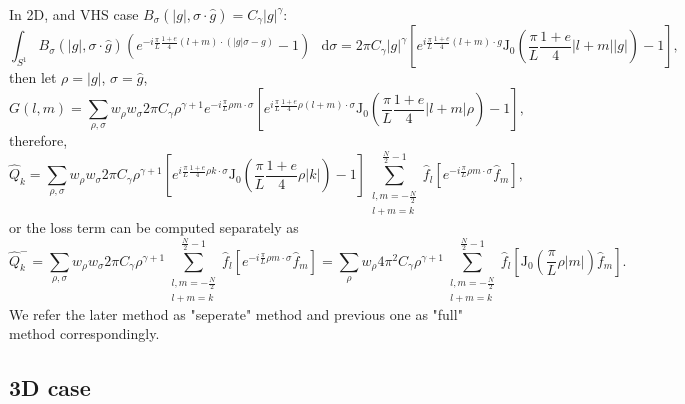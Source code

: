 \documentclass[review, times]{elsarticle}
\newcommand*\diff{\mathop{}\!\mathrm{d}}
\begin{document}
In 2D, and VHS case $B_{\sigma}(|g|,\sigma\cdot \hat{g})=C_{\gamma}|g|^{\gamma}$:
\begin{equation}
  \int_{S^1}B_{\sigma}(|g|,\sigma\cdot \hat{g})\left(e^{-i\frac{\pi}{L}\frac{1+e}{4}(l+m)\cdot (|g|\sigma-g)}-1\right)\,\diff{\sigma}=2\pi C_{\gamma}|g|^{\gamma}\left[ e^{i\frac{\pi}{L}\frac{1+e}{4}(l+m)\cdot g}\text{J}_0\left(\frac{\pi}{L}\frac{1+e}{4}|l+m||g|\right)-1\right],
\end{equation}
then let $\rho=|g|$, $\sigma=\hat{g}$,
\begin{equation}
  G(l,m)=\sum_{\rho,\sigma}w_{\rho}w_{\sigma}2\pi C_{\gamma}\rho^{\gamma+1}e^{-i\frac{\pi}{L}\rho m \cdot \sigma}\left[ e^{i\frac{\pi}{L}\frac{1+e}{4}\rho (l+m)\cdot \sigma}\text{J}_0\left(\frac{\pi}{L}\frac{1+e}{4}|l+m|\rho\right)-1\right],
\end{equation}
therefore,
\begin{equation} 
  \hat{Q}_k=\sum_{\rho,\sigma}w_{\rho}w_{\sigma}2\pi C_{\gamma}\rho^{\gamma+1}\left[ e^{i\frac{\pi}{L}\frac{1+e}{4}\rho k\cdot \sigma}\text{J}_0\left(\frac{\pi}{L}\frac{1+e}{4}\rho |k|\right)-1\right]\sum_{\substack{l,m=-\frac{N}{2}\\l+m=k}}^{\frac{N}{2}-1}\hat{f}_l \left[e^{-i\frac{\pi}{L}\rho m \cdot \sigma}\hat{f}_m\right],
\end{equation} 
or the loss term can be computed separately as
\begin{equation} 
\hat{Q}_k^-=\sum_{\rho,\sigma}w_{\rho}w_{\sigma}2\pi C_{\gamma}\rho^{\gamma+1}\sum_{\substack{l,m=-\frac{N}{2}\\l+m=k}}^{\frac{N}{2}-1}\hat{f}_l \left[e^{-i\frac{\pi}{L}\rho m \cdot \sigma}\hat{f}_m\right]=\sum_{\rho}w_{\rho}4\pi^2 C_{\gamma}\rho^{\gamma+1}\sum_{\substack{l,m=-\frac{N}{2}\\l+m=k}}^{\frac{N}{2}-1}\hat{f}_l \left[\text{J}_0\left(\frac{\pi}{L}\rho |m|\right)\hat{f}_m\right].
\end{equation}
We refer the later method as "seperate" method and previous one as "full" method correspondingly.

\subsection{3D case}
\end{document}
